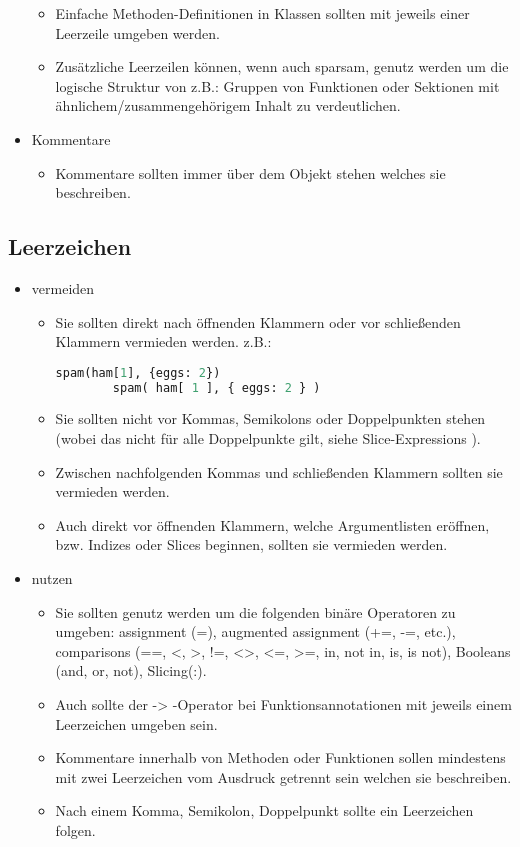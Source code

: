 \begin{itemize}
\begin{itemize}
		\item Einfache Methoden-Definitionen in Klassen sollten mit jeweils einer Leerzeile umgeben werden.
		\item Zusätzliche Leerzeilen können, wenn auch sparsam, genutz werden um die logische Struktur von z.B.: Gruppen von Funktionen oder Sektionen mit ähnlichem/zusammengehörigem Inhalt zu verdeutlichen.
	\end{itemize}
	\item Kommentare
	\begin{itemize}
		\item Kommentare sollten immer über dem Objekt stehen welches sie beschreiben.
	\end{itemize}
\end{itemize}

\subsection{Leerzeichen}
\begin{itemize}
	\item vermeiden
	\begin{itemize}
		\item Sie sollten direkt nach öffnenden Klammern oder vor schließenden Klammern vermieden werden.
		z.B.: 
		\begin{lstlisting}[language=python]
		spam(ham[1], {eggs: 2})
		spam( ham[ 1 ], { eggs: 2 } )
		\end{lstlisting}
		\item Sie sollten nicht vor Kommas, Semikolons oder Doppelpunkten stehen (wobei das nicht für alle Doppelpunkte gilt, siehe \grqq Slice-Expressions \grqq).
		\item Zwischen \grqq nachfolgenden \grqq Kommas und schließenden Klammern sollten sie vermieden werden.
		\item Auch direkt vor öffnenden Klammern, welche Argumentlisten eröffnen, bzw. Indizes oder Slices beginnen, sollten sie vermieden werden.
	\end{itemize}
	\item nutzen
	\begin{itemize}
		\item Sie sollten genutz werden um die folgenden binäre Operatoren zu umgeben: assignment (=), augmented assignment (+=, -=, etc.), comparisons (==, <, >, !=, <>, <=, >=, in, not in, is, is not), Booleans (and, or, not), Slicing(:).
		\item Auch sollte der \grqq -> \grqq -Operator bei Funktionsannotationen mit jeweils einem Leerzeichen umgeben sein.
		\item Kommentare innerhalb von Methoden oder Funktionen sollen mindestens mit zwei Leerzeichen vom Ausdruck getrennt sein welchen sie beschreiben.
		\item Nach einem Komma, Semikolon, Doppelpunkt sollte ein Leerzeichen folgen.
	\end{itemize}
\end{itemize}

